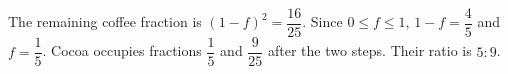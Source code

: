 The remaining coffee fraction is $(1-f)^2=\dfrac{16}{25}$. Since $0\le f\le1$, $1-f=\dfrac{4}{5}$ and $f=\dfrac{1}{5}$. Cocoa occupies fractions $\dfrac{1}{5}$ and $\dfrac{9}{25}$ after the two steps. Their ratio is $\boxed{5:9}$.
